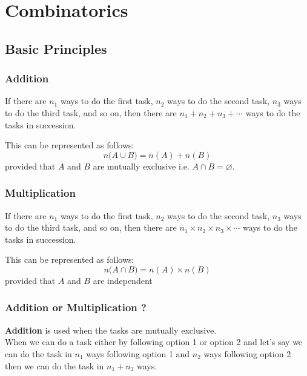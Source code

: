 \chapter{Combinatorics}
\section{Basic Principles}
\subsection{Addition}
\begin{theorem}
    If there are $n_1$ ways to do the first task, $n_2$ ways to do the second task, 
    $n_3$ ways to do the third task, and so on, then there are $n_1+n_2+n_3+\cdots$ ways
    to do the tasks in succession.
\end{theorem}
This can be represented as follows:
$$
    \displaystyle
    n\big(A \cup B\big) = n(A) + n(B) 
$$
provided that $A$ and $B$ are mutually exclusive i.e. $A\cap B = \varnothing  $.



\subsection{Multiplication}
\begin{theorem}
    If there are $n_1$ ways to do the first task, $n_2$ ways to do the second task,
    $n_3$ ways to do the third task, and so on, then there are $n_1\times n_2\times n_3\times\cdots$
    ways to do the tasks in succession.
\end{theorem}
This can be represented as follows:
$$
    \displaystyle
    n\big(A \cap B\big) = n(A) \times n(B)
$$
provided that $A$ and $B$ are independent

\subsection{Addition or Multiplication ?}
\textbf{Addition} is used when the tasks are mutually exclusive.\\
When we can do a task either by following option 1 or option 2 and let's say
we can do the task in $n_1$ ways following option 1 and $n_2$ ways following option 2\\
then we can do the task in $n_1+n_2$ ways.\\
\newline

